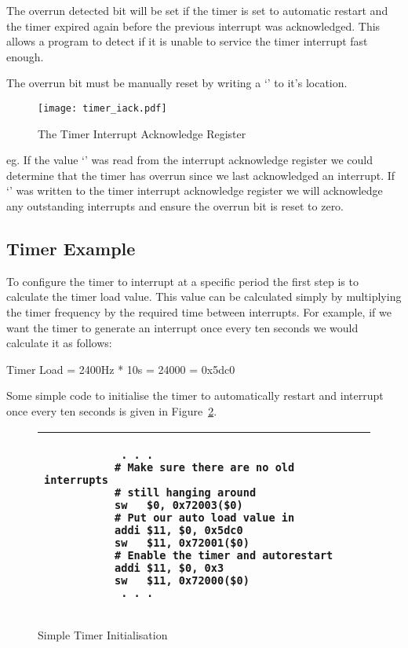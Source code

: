 The overrun detected bit will be set if the timer is set to automatic
restart and the timer expired again before the previous interrupt was
acknowledged. This allows a program to detect if it is unable to
service the timer interrupt fast enough.

The overrun bit must be manually reset by writing a `' to
it's location.

\begin{figure}[h]
\begin{center}
\texttt{[image: timer\_iack.pdf]}
\caption{The Timer Interrupt Acknowledge Register}
\label{timer_iack_pic}
\end{center}
\end{figure}

eg. If the value `' was read from the interrupt acknowledge
register we could determine that the timer has overrun since we last
acknowledged an interrupt. If `' was written to the timer
interrupt acknowledge register we will acknowledge any outstanding
interrupts and ensure the overrun bit is reset to zero.

\subsection{Timer Example}

To configure the timer to interrupt at a specific period the first
step is to calculate the timer load value. This value can be
calculated simply by multiplying the timer frequency by the required
time between interrupts. For example, if we want the timer to generate
an interrupt once every ten seconds we would calculate it as follows:

\begin{center}
Timer Load = 2400Hz * 10s = 24000 = 0x5dc0
\end{center}

Some simple code to initialise the timer to automatically restart and
interrupt once every ten seconds is given in
Figure~\ref{code:timer_init}.

\begin{figure}[h]
\begin{footnotesize}
\begin{center}
\begin{tabular}{|p{8cm}|}
\hline
\begin{verbatim}
            . . .
           # Make sure there are no old interrupts
           # still hanging around
           sw   $0, 0x72003($0)
           # Put our auto load value in
           addi $11, $0, 0x5dc0
           sw   $11, 0x72001($0)
           # Enable the timer and autorestart
           addi $11, $0, 0x3
           sw   $11, 0x72000($0)
            . . .
\end{verbatim}
\\
\hline
\end{tabular}
\end{center}
\end{footnotesize}
\caption{Simple Timer Initialisation}
\label{code:timer_init}
\end{figure}
